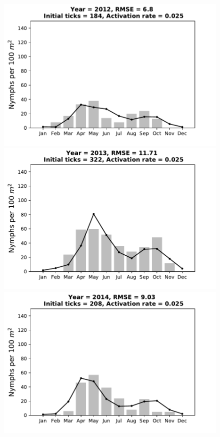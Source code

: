 \documentclass[a4paper, 11pt]{scrartcl}
\begin{document}
\begin{figure}[h!]
\begin{minipage}[c]{0.40\linewidth}
\end{minipage}
\begin{minipage}[c]{0.40\linewidth}
\includegraphics[width=\linewidth]{figures/s2/S2_2012}
\end{minipage}
\begin{minipage}[c]{0.40\linewidth}
\includegraphics[width=\linewidth]{figures/s2/S2_2013}
\end{minipage}
\begin{minipage}[c]{0.40\linewidth}
\includegraphics[width=\linewidth]{figures/s2/S2_2014}

\end{minipage}
\end{figure}
\end{document}
